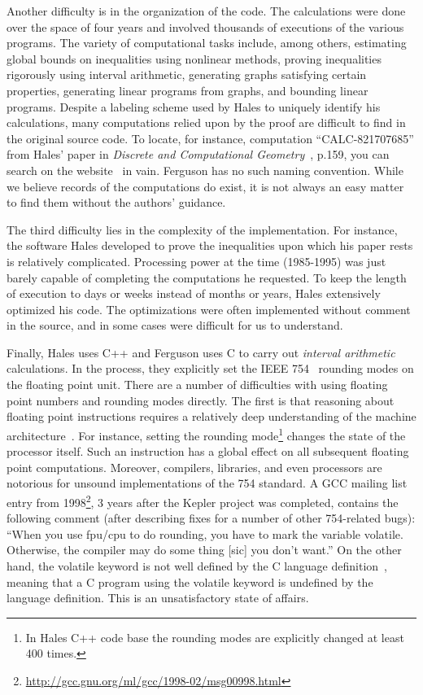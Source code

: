 \documentclass[11pt]{amsart}
\begin{document}
Another difficulty is in the organization of the code. The
calculations were done over the space of four years and involved %
thousands of executions of the various programs. The variety of
computational tasks include, among others, estimating global bounds on
inequalities using nonlinear methods, proving inequalities rigorously
using interval arithmetic, generating graphs satisfying certain
properties, generating linear programs from graphs, and bounding
linear programs. Despite a labeling scheme used by Hales to uniquely
identify his calculations, many computations relied upon by the proof
are difficult to find in the original source code. To locate, for
instance, computation ``CALC-821707685'' from Hales' paper in
\emph{Discrete and Computational Geometry}~\cite{Hales:2006:DCG},
p.159, you can search on the website~\cite{website:Hales:1998:Code} in
vain. Ferguson has no such naming convention. While we believe records
of the computations do exist, it is not always an easy matter
to find them without the authors' guidance.

The third difficulty lies in the complexity of the implementation. For instance,
the software Hales developed to prove the inequalities upon which his
paper rests is relatively complicated. Processing power at the time
(1985-1995) was just barely capable of completing the computations he
requested. To keep the length of execution to days or weeks instead of
months or years, Hales extensively optimized his code. The
optimizations were often implemented without comment in the source,
and in some cases were difficult for us to understand.  

Finally, Hales uses C++ and Ferguson uses C to carry out
\emph{interval arithmetic} calculations. In the process, they
explicitly set the IEEE 754~\cite{IEEE:1985:IEE754} rounding modes on
the floating point unit. There are a number of difficulties with using
floating point numbers and rounding modes directly. The first is that
reasoning about floating point instructions requires a relatively deep
understanding of the machine architecture~\cite{Monniaux:2008:TOPLAS}.
For instance, setting the rounding mode\footnote{In Hales C++ code
base the rounding modes are explicitly changed at least 400 times.}
changes the state of the processor itself. Such an instruction has a
global effect on all subsequent floating point computations. Moreover,
compilers, libraries, and even processors are notorious for unsound
implementations of the 754 standard. A GCC mailing list entry from
1998\footnote{\url{http://gcc.gnu.org/ml/gcc/1998-02/msg00998.html}},
3 years after the Kepler project was completed, contains the following
comment (after describing fixes for a number of other 754-related
bugs): ``When you use fpu/cpu to do rounding, you have to mark the
variable volatile. Otherwise, the compiler may do some thing [sic] you don't
want.'' On the other hand, the volatile keyword is not well defined by
the C language definition~\cite{Kernighan:1988:C}, meaning that a C
program using the volatile keyword is undefined by the
language definition. This is an unsatisfactory state of affairs.
\end{document}
